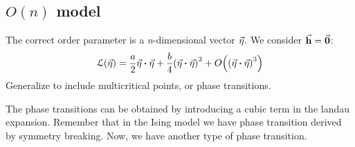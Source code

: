 \documentclass[../main/main.tex]{subfiles}
\begin{document}

\subsection{\( O(n) \) model}


The correct order parameter is a \emph{n}-dimensional vector \( \va{\eta } \). We consider \( \va{h} = \va{0} \):
\begin{equation}
  \mathcal{L} (\va{\eta }) = \frac{a}{2} \va{\eta } \vdot \va{\eta } + \frac{b}{4} \qty(\va{\eta } \vdot \va{\eta })^2 + O \qty(\qty(\va{\eta } \vdot \va{\eta })^3 )
\end{equation}
Generalize to include multicritical points, or phase transitions.

The phase transitions can be obtained by introducing a cubic term in the landau expansion. Remember that in the Ising model we have phase transition derived by symmetry breaking. Now, we have another type of phase transition.
\end{document}
